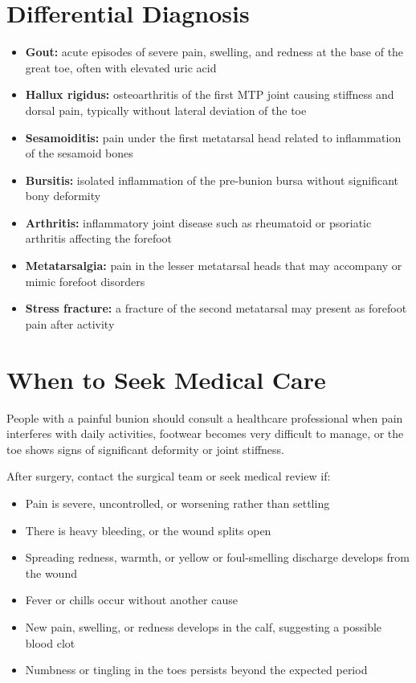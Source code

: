 \section*{Differential Diagnosis}
\begin{itemize}
    \item \textbf{Gout:} acute episodes of severe pain, swelling, and redness at the base of the great toe, often with elevated uric acid
    \item \textbf{Hallux rigidus:} osteoarthritis of the first MTP joint causing stiffness and dorsal pain, typically without lateral deviation of the toe
    \item \textbf{Sesamoiditis:} pain under the first metatarsal head related to inflammation of the sesamoid bones
    \item \textbf{Bursitis:} isolated inflammation of the pre-bunion bursa without significant bony deformity
    \item \textbf{Arthritis:} inflammatory joint disease such as rheumatoid or psoriatic arthritis affecting the forefoot
    \item \textbf{Metatarsalgia:} pain in the lesser metatarsal heads that may accompany or mimic forefoot disorders
    \item \textbf{Stress fracture:} a fracture of the second metatarsal may present as forefoot pain after activity
\end{itemize}

\section*{When to Seek Medical Care}
People with a painful bunion should consult a healthcare professional when pain interferes with daily activities, footwear becomes very difficult to manage, or the toe shows signs of significant deformity or joint stiffness.

After surgery, contact the surgical team or seek medical review if:
\begin{itemize}
    \item Pain is severe, uncontrolled, or worsening rather than settling
    \item There is heavy bleeding, or the wound splits open
    \item Spreading redness, warmth, or yellow or foul-smelling discharge develops from the wound
    \item Fever or chills occur without another cause
    \item New pain, swelling, or redness develops in the calf, suggesting a possible blood clot
    \item Numbness or tingling in the toes persists beyond the expected period
\end{itemize}

